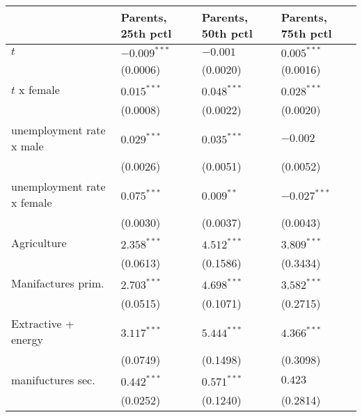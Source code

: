 \begin{tabular}{llll}
\toprule
{} & Parents, 25th pctl & Parents, 50th pctl & Parents, 75th pctl \\
\midrule
$t$                                                &     $-0.009^{***}$ &           $-0.001$ &      $0.005^{***}$ \\
                                                   &           (0.0006) &           (0.0020) &           (0.0016) \\
$t$ x female                                       &      $0.015^{***}$ &      $0.048^{***}$ &      $0.028^{***}$ \\
                                                   &           (0.0008) &           (0.0022) &           (0.0020) \\
unemployment rate x male                           &      $0.029^{***}$ &      $0.035^{***}$ &           $-0.002$ \\
                                                   &           (0.0026) &           (0.0051) &           (0.0052) \\
unemployment rate x female                         &      $0.075^{***}$ &       $0.009^{**}$ &     $-0.027^{***}$ \\
                                                   &           (0.0030) &           (0.0037) &           (0.0043) \\
Agriculture                                        &      $2.358^{***}$ &      $4.512^{***}$ &      $3.809^{***}$ \\
                                                   &           (0.0613) &           (0.1586) &           (0.3434) \\
Manifactures prim.                                 &      $2.703^{***}$ &      $4.698^{***}$ &      $3.582^{***}$ \\
                                                   &           (0.0515) &           (0.1071) &           (0.2715) \\
Extractive + energy                                &      $3.117^{***}$ &      $5.444^{***}$ &      $4.366^{***}$ \\
                                                   &           (0.0749) &           (0.1498) &           (0.3098) \\
manifuctures sec.                                  &      $0.442^{***}$ &      $0.571^{***}$ &            $0.423$ \\
                                                   &           (0.0252) &           (0.1240) &           (0.2814) \\

\end{tabular}
